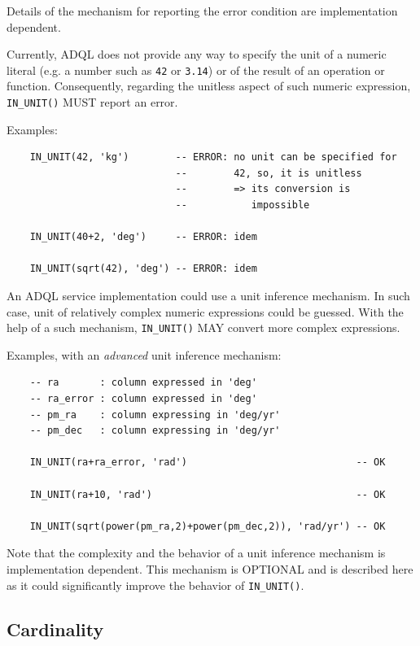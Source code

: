 \documentclass[11pt,a4paper]{ivoa}
\begin{document}
Details of the mechanism for reporting the error condition are implementation
dependent.

Currently, ADQL does not provide any way to specify the unit of a numeric
literal (e.g. a number such as \verb:42: or \verb:3.14:) or of the result of an
operation or function. Consequently, regarding the unitless aspect of such
numeric expression, \verb:IN_UNIT(): MUST report an error.

Examples:

\begin{verbatim}
    IN_UNIT(42, 'kg')        -- ERROR: no unit can be specified for
                             --        42, so, it is unitless
                             --        => its conversion is
                             --           impossible

    IN_UNIT(40+2, 'deg')     -- ERROR: idem

    IN_UNIT(sqrt(42), 'deg') -- ERROR: idem
\end{verbatim}

An ADQL service implementation could use a unit inference mechanism. In such
case, unit of relatively complex numeric expressions could be guessed. With the
help of a such mechanism, \verb:IN_UNIT(): MAY convert more complex
expressions.

Examples, with an \emph{advanced} unit inference mechanism:

\begin{verbatim}
    -- ra       : column expressed in 'deg'
    -- ra_error : column expressed in 'deg'
    -- pm_ra    : column expressing in 'deg/yr'
    -- pm_dec   : column expressing in 'deg/yr'

    IN_UNIT(ra+ra_error, 'rad')                             -- OK

    IN_UNIT(ra+10, 'rad')                                   -- OK

    IN_UNIT(sqrt(power(pm_ra,2)+power(pm_dec,2)), 'rad/yr') -- OK
\end{verbatim}

Note that the complexity and the behavior of a unit inference mechanism is
implementation dependent. This mechanism is OPTIONAL and is described here
as it could significantly improve the behavior of \verb:IN_UNIT():.

\subsection{Cardinality}
\label{sec:cardinality}
\end{document}
